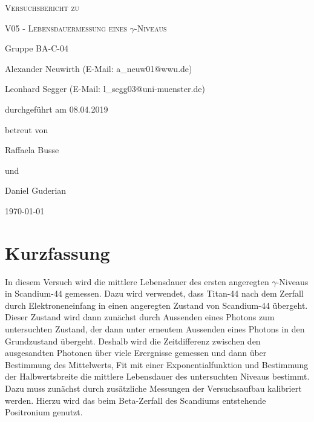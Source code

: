 \documentclass[
	a4paper,
	12pt,
	pagesize,
	ngerman
]{scrartcl}
\begin{document}
	\begin{titlepage}
		\centering
		{\scshape\LARGE Versuchsbericht zu \par}
		\vspace{1cm}
		{\scshape\huge V05 - Lebensdauermessung eines $\gamma$-Niveaus \par}
		\vspace{2.5cm}
		{\LARGE Gruppe BA-C-04 \par}
		\vspace{0.5cm}

		{\large Alexander Neuwirth (E-Mail: a\_neuw01@wwu.de) \par}
		{\large Leonhard Segger (E-Mail: l\_segg03@uni-muenster.de) \par}
		\vfill

		durchgeführt am 08.04.2019\par
		betreut von\par
		{\large Raffaela Busse} \par %
		und \par
		{\large Daniel Guderian}
		\vfill

		{\large \today\par}
	\end{titlepage}
	\tableofcontents
	\newpage


	\section{Kurzfassung}
	In diesem Versuch wird die mittlere Lebensdauer des ersten angeregten $\gamma$-Niveaus in Scandium-44 gemessen.
	Dazu wird verwendet, dass Titan-44 nach dem Zerfall durch Elektroneneinfang in einen angeregten Zustand von Scandium-44 übergeht.
	Dieser Zustand wird dann zunächst durch Aussenden eines Photons zum untersuchten Zustand, der dann unter erneutem Aussenden eines Photons in den Grundzustand übergeht.
	Deshalb wird die Zeitdifferenz zwischen den ausgesandten Photonen über viele Erergnisse gemessen und dann über Bestimmung des Mittelwerts, Fit mit einer Exponentialfunktion und Bestimmung der Halbwertsbreite die mittlere Lebensdauer des untersuchten Niveaus bestimmt.
	Dazu muss zunächst durch zusätzliche Messungen der Versuchsaufbau kalibriert werden.
	Hierzu wird das beim Beta-Zerfall des Scandiums entstehende Positronium genutzt.
\end{document}
